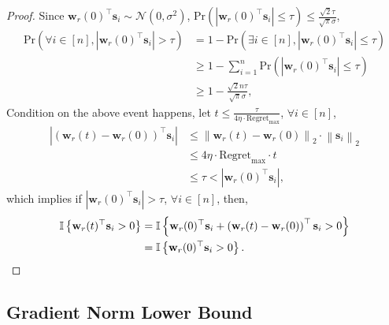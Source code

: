 \documentclass[10pt]{article}
\def\rvs{{\mathbf{s}}}
\def\rvw{{\mathbf{w}}}
\def\pr{{\text{Pr}}}
\def\regret{{\text{Regret}}}
\def\sI{{\mathbb{I}}}
\def\gN{{\mathcal{N}}}
\begin{document}
\begin{proof}
Since $\rvw_r(0)^\top \rvs_i \sim \gN(0, \sigma^2)$, $\pr\left(\left| \rvw_r(0)^\top \rvs_i \right| \le \tau\right) \le  \frac{\sqrt{2}\tau}{\sqrt{\pi}\sigma}$,
\begin{equation*}
\begin{split}
	\pr\left(\forall i \in [n], \left| \rvw_r(0)^\top \rvs_i \right| > \tau\right) &= 1 - \pr\left(\exists i \in [n], \left| \rvw_r(0)^\top \rvs_i \right| \le \tau\right) \\
	&\ge 1 - \sum\limits_{i=1}^{n}{ \pr\left(\left| \rvw_r(0)^\top \rvs_i \right| \le \tau\right) } \\
	&\ge 1 - \frac{\sqrt{2}n\tau}{\sqrt{\pi}\sigma},
\end{split}
\end{equation*}
Condition on the above event happens, let $t \le \frac{\tau}{ 4 \eta \cdot \regret_{\max} }$, $\forall i \in [n]$,
\begin{equation*}
\begin{split}
	\left| \left( \rvw_r(t) - \rvw_r(0) \right)^\top \rvs_i \right| &\le \left\| \rvw_r(t) - \rvw_r(0) \right\|_2 \cdot \left\| \rvs_i \right\|_2 \\
	&\le 4 \eta \cdot \regret_{\max} \cdot t \\
	&\le \tau < \left| \rvw_r(0)^\top \rvs_i \right|,
\end{split}
\end{equation*}
which implies if $\left| \rvw_r(0)^\top \rvs_i \right| > \tau$, $\forall i \in [n]$, then,
\begin{equation*}
\begin{split}
	\sI\left\{ \rvw_r(t)^\top \rvs_i > 0 \right\} &= \sI\left\{ \rvw_r(0)^\top \rvs_i  + \left( \rvw_r(t) - \rvw_r(0) \right)^\top \rvs_i > 0 \right\} \\
	&= \sI\left\{ \rvw_r(0)^\top \rvs_i > 0 \right\}. \qedhere
\end{split}
\end{equation*}
\end{proof}

\subsection{Gradient Norm Lower Bound}
\end{document}
